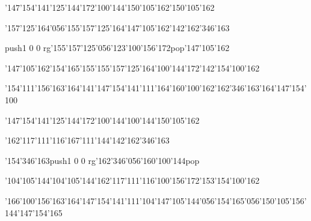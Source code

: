 \null\vfill\ipa\centerline{\enskip\char'147\char'154\char'141\char'125\char'144\char'172\enskip\enskip\enskip\enskip\enskip\enskip\enskip\char'100\char'144\enskip\enskip\enskip\char'150\char'105\char'162\enskip\char'150\char'105\char'162}\medskip\centerline{\enskip\char'157\char'125\char'164\char'056\char'155\char'157\char'125\char'164\enskip\enskip\enskip\enskip\char'147\char'105\char'162\enskip\enskip\enskip\enskip\enskip\char'142\char'162\char'346\char'163}\medskip\centerline{\enskip\enskip\enskip\enskip\enskip\pdfcolorstack\match push{1 0 0 rg}\char'155\char'157\char'125\char'056\char'123\char'100\char'156\char'172\pdfcolorstack\match pop{}\enskip\enskip\enskip\char'147\char'105\char'162}\medskip\centerline{\enskip\enskip\enskip\enskip\char'147\char'105\char'162\enskip\char'154\char'165\char'155\enskip\char'155\char'157\char'125\char'164\enskip\char'100\char'144\char'172\enskip\char'142\char'154\char'100\char'162}\medskip\centerline{\enskip\enskip\char'154\char'111\char'156\char'163\char'164\enskip\char'141\enskip\char'147\char'154\char'141\char'111\char'164\enskip\char'160\char'100\char'162\enskip\enskip\enskip\char'162\char'346\char'163\char'164\enskip\char'147\char'154\char'100}\medskip\vfill\footline{\hfil\tt\folio\hfil}\eject
\null\vfill\ipa\centerline{\enskip\char'147\char'154\char'141\char'125\char'144\char'172\enskip\char'100\char'144\enskip\enskip\enskip\enskip\char'100\char'144\enskip\enskip\enskip\enskip\enskip\enskip\enskip\char'150\char'105\char'162}\medskip\centerline{\enskip\enskip\enskip\enskip\char'162\char'117\char'111\char'116\enskip\enskip\enskip\enskip\char'167\char'111\char'144\enskip\enskip\enskip\enskip\enskip\char'142\char'162\char'346\char'163}\medskip\centerline{\enskip\char'154\char'346\char'163\enskip\enskip\enskip\enskip\enskip\enskip\enskip\enskip\enskip\pdfcolorstack\match push{1 0 0 rg}\char'162\char'346\char'056\char'160\char'100\char'144\pdfcolorstack\match pop{}}\medskip\centerline{\enskip\enskip\enskip\enskip\char'104\char'105\char'144\enskip\char'104\char'105\char'144\enskip\char'162\char'117\char'111\char'116\enskip\char'100\char'156\char'172\enskip\char'153\char'154\char'100\char'162}\medskip\centerline{\enskip\enskip\char'166\char'100\char'156\char'163\char'164\enskip\enskip\enskip\char'147\char'154\char'141\char'111\char'104\enskip\char'147\char'105\char'144\char'056\char'154\char'165\char'056\char'150\char'105\char'156\char'144\enskip\char'147\char'154\char'165}\medskip\vfill\footline{\hfil\tt\folio\hfil}\eject

